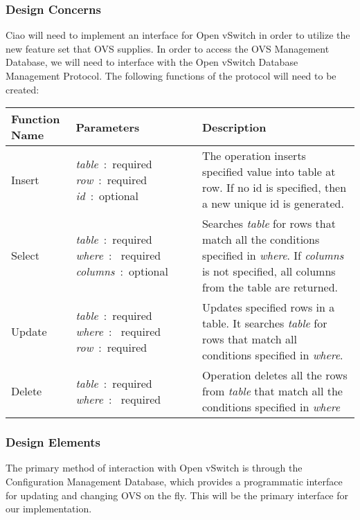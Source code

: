 \documentclass[10pt,onecolumn,journal,draftclsnofoot]{IEEEtran}
\begin{document}
\subsubsection{Design Concerns}
Ciao will need to implement an interface for Open vSwitch in order to utilize
the new feature set that OVS supplies. In order to access the OVS Management
Database, we will need to interface with the Open vSwitch Database Management
Protocol\cite{rfc7047}. The following functions of the protocol will need to be
created:\cite{rfc7047}\\

\begin{center}
	\begin{tabular}{| p{3cm} | p{4cm} | p{6cm} |}
		\hline
		Function Name & Parameters & Description \\ \hline
		Insert & \textit{table}~:~required \newline
		\textit{row}~:~required \newline \textit{id}~:~optional &
		The operation inserts specified value into
		table at row. If no id is specified, then a new unique
		id is generated.\\ \hline
		Select & \textit{table}~:~required \newline \textit{where}~:~
		required \newline \textit{columns}~:~optional & Searches
		\textit{table} for rows that match all the conditions specified
		in \textit{where}. If \textit{columns} is not specified, all
		columns from the table are returned.\\ \hline
		Update & \textit{table}~:~required \newline \textit{where}~:~
		required \newline \textit{row}~:~required & Updates specified
		rows in a table. It searches \textit{table} for rows that match
		all conditions specified in \textit{where}.\\ \hline
		Delete & \textit{table}~:~required \newline \textit{where}~:~
		required & Operation deletes all the rows from \textit{table}
		that match all the conditions specified in \textit{where} \\ \hline
	\end{tabular}
\end{center}

\subsubsection{Design Elements}
The primary method of interaction with Open vSwitch is through the Configuration
Management Database, which provides a programmatic interface for updating and
changing OVS on the fly. This will be the primary interface for our
implementation.
\end{document}
